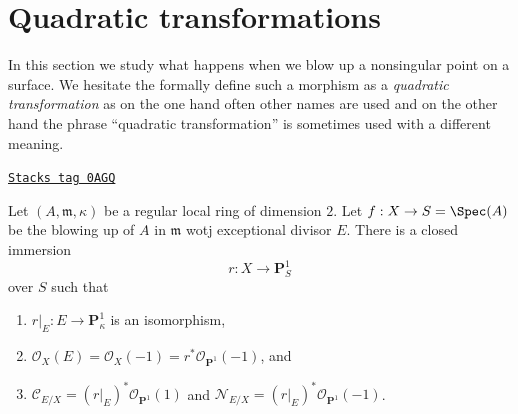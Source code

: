 \section{Quadratic transformations}
\label{resolve-section-quadratic}
In this section we study what happens when we blow up a nonsingular point
on a surface. We hesitate the formally define such a morphism as a
{\it quadratic transformation} as on the one hand often other names are
used and on the other hand the phrase ``quadratic transformation'' is
sometimes used with a different meaning.

\begin{lemma}[Blowup]
\label{resolve-lemma-blowup}
\href{https://stacks.math.columbia.edu/tag/0AGQ}{\texttt{Stacks tag 0AGQ}}

Let $(A, \mathfrak m, \kappa)$ be a regular local ring of dimension $2$.
Let $f : X \to S = \Spec(A)$ be the blowing up of $A$ in $\mathfrak m$
wotj exceptional divisor $E$. There is a closed immersion
$$
r : X \longrightarrow \mathbf{P}^1_S
$$
over $S$ such that
\begin{enumerate}
\item $r|_E : E \to \mathbf{P}^1_\kappa$ is an isomorphism,
\item $\mathcal{O}_X(E) = \mathcal{O}_X(-1) =
r^*\mathcal{O}_{\mathbf{P}^1}(-1)$, and
\item $\mathcal{C}_{E/X} = (r|_E)^*\mathcal{O}_{\mathbf{P}^1}(1)$ and
$\mathcal{N}_{E/X} = (r|_E)^*\mathcal{O}_{\mathbf{P}^1}(-1)$.
\end{enumerate}
\end{lemma}

